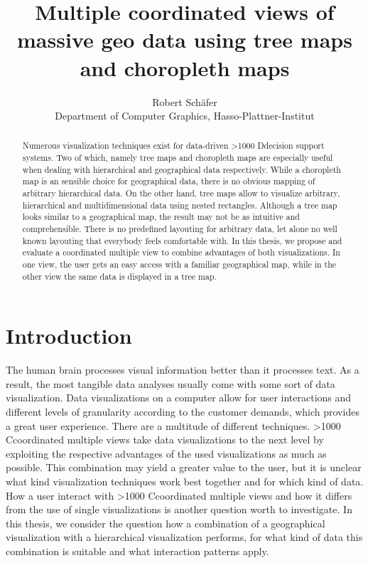 \documentclass{article}
\newcommand\hmm[1]{\ifnum\ifhmode\spacefactor\else2000\fi>1000 \uppercase{#1}\else#1\fi}
\newcommand{\cmvs}{\hmm{c}oordinated multiple views}
\newcommand{\dss}{\hmm{d}ecision support systems}
\begin{document}
\title{Multiple coordinated views of massive geo data using tree maps and choropleth maps}
\author{Robert Schäfer\\ Department of Computer Graphics, Hasso-Plattner-Institut}
\maketitle
\clearpage

\tableofcontents
\clearpage



\begin{abstract}
  Numerous visualization techniques exist for data-driven \dss{}.
  Two of which, namely tree maps and choropleth maps are especially useful when dealing with hierarchical and geographical data respectively.
  While a choropleth map is an sensible choice for geographical data, there is no obvious mapping of arbitrary hierarchical data.
  On the other hand, tree maps allow to visualize arbitrary, hierarchical and multidimensional data using nested rectangles.
  Although a tree map looks similar to a geographical map, the result may not be as intuitive and comprehensible.
  There is no predefined layouting for arbitrary data, let alone no well known layouting that everybody feels comfortable with.
  In this thesis, we propose and evaluate a coordinated multiple view to combine advantages of both visualizations.
  In one view, the user gets an easy access with a familiar geographical map, while in the other view the same data is displayed in a tree map.
\end{abstract}
\clearpage

\section{Introduction}
The human brain processes visual information better than it processes text.
As a result, the most tangible data analyses usually come with some sort of data visualization.
Data visualizations on a computer allow for user interactions and different levels of granularity according to the customer demands, which provides a great user experience.
There are a multitude of different techniques.
\cmvs{} take data visualizations to the next level by exploiting the respective advantages of the used visualizations as much as possible.
This combination may yield a greater value to the user, but it is unclear what kind visualization techniques work best together and for which kind of data.
How a user interact with \cmvs{} and how it differs from the use of single visualizations is another question worth to investigate.
In this thesis, we consider the question how a combination of a geographical visualization with a hierarchical visualization performs, for what kind of data this combination is suitable and what interaction patterns apply.
\end{document}
